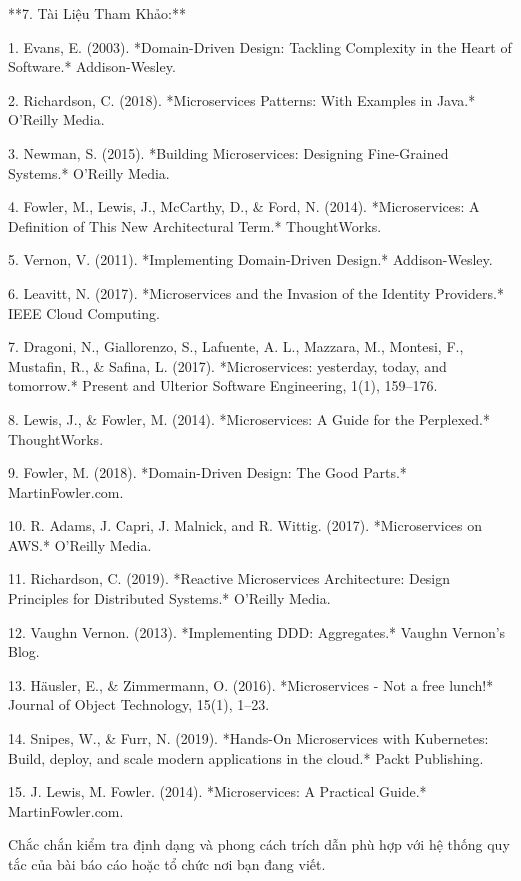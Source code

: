 **7. Tài Liệu Tham Khảo:**

1. Evans, E. (2003). *Domain-Driven Design: Tackling Complexity in the Heart of Software.* Addison-Wesley.

2. Richardson, C. (2018). *Microservices Patterns: With Examples in Java.* O'Reilly Media.

3. Newman, S. (2015). *Building Microservices: Designing Fine-Grained Systems.* O'Reilly Media.

4. Fowler, M., Lewis, J., McCarthy, D., & Ford, N. (2014). *Microservices: A Definition of This New Architectural Term.* ThoughtWorks.

5. Vernon, V. (2011). *Implementing Domain-Driven Design.* Addison-Wesley.

6. Leavitt, N. (2017). *Microservices and the Invasion of the Identity Providers.* IEEE Cloud Computing.

7. Dragoni, N., Giallorenzo, S., Lafuente, A. L., Mazzara, M., Montesi, F., Mustafin, R., & Safina, L. (2017). *Microservices: yesterday, today, and tomorrow.* Present and Ulterior Software Engineering, 1(1), 159–176.

8. Lewis, J., & Fowler, M. (2014). *Microservices: A Guide for the Perplexed.* ThoughtWorks.

9. Fowler, M. (2018). *Domain-Driven Design: The Good Parts.* MartinFowler.com.

10. R. Adams, J. Capri, J. Malnick, and R. Wittig. (2017). *Microservices on AWS.* O'Reilly Media.

11. Richardson, C. (2019). *Reactive Microservices Architecture: Design Principles for Distributed Systems.* O'Reilly Media.

12. Vaughn Vernon. (2013). *Implementing DDD: Aggregates.* Vaughn Vernon's Blog.

13. Häusler, E., & Zimmermann, O. (2016). *Microservices - Not a free lunch!* Journal of Object Technology, 15(1), 1–23.

14. Snipes, W., & Furr, N. (2019). *Hands-On Microservices with Kubernetes: Build, deploy, and scale modern applications in the cloud.* Packt Publishing.

15. J. Lewis, M. Fowler. (2014). *Microservices: A Practical Guide.* MartinFowler.com.

Chắc chắn kiểm tra định dạng và phong cách trích dẫn phù hợp với hệ thống quy tắc của bài báo cáo hoặc tổ chức nơi bạn đang viết.




